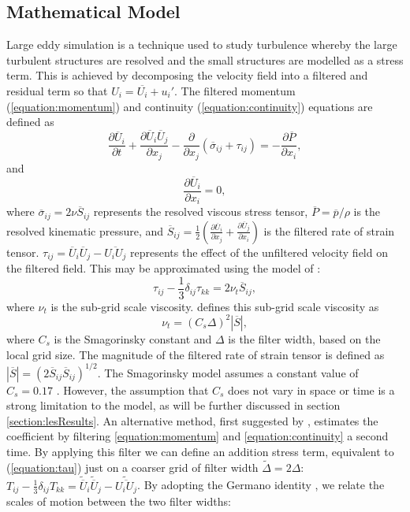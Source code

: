\documentclass[12pt,oneside,a4paper]{article}
\newcommand{\pdev}[2]{\frac{\partial {#1}}{\partial {#2}}}
\newcommand{\vecti}[1]{{#1}_{i}}
\newcommand{\vectj}[1]{{#1}_{j}}
\newcommand{\matij}[1]{{#1}_{ij}}
\begin{document}
\subsection{Mathematical Model}
\label{section:mathematicalModel}
Large eddy simulation is a technique used to study turbulence whereby the large turbulent structures are resolved and the small structures are modelled as a stress term. This is achieved by decomposing the velocity field into a filtered and residual term so that $\vecti{U} = \overline{\vecti{U}} + \vecti{u}'$. The filtered momentum (\ref{equation:momentum}) and continuity (\ref{equation:continuity}) equations \citep{pope2001} are defined as
\begin{equation}
\label{equation:momentum}
\pdev{\vecti{\overline{U}}}{t} + \pdev{\vecti{\overline{U}} \vectj{\overline{U}}}{\vectj{x}} - \pdev{}{\vectj{x}}(\matij{\overline{\sigma}} + \matij{\tau}) = - \pdev{\overline{P}}{\vecti{x}},
\end{equation}
and
\begin{equation}
\label{equation:continuity}
\pdev{\vecti{\overline{U}}}{\vecti{x}} = 0,
\end{equation}
where $\matij{\overline{\sigma}} = 2\nu \matij{\overline{S}}$ represents the resolved viscous stress tensor, $\overline{P} = \overline{p}/\rho$ is the resolved kinematic pressure, and $\matij{\overline{S}} = \frac{1}{2}\left( \pdev{\vecti{\overline{U}}}{\vectj{x}} + \pdev{\vectj{\overline{U}}}{\vecti{x}} \right)$ is the filtered rate of strain tensor. $\tau_{ij} = \vecti{\overline{U}} \vectj{\overline{U}} - \overline{\vecti{U} \vectj{U}}$ represents the effect of the unfiltered velocity field on the filtered field. This may be approximated using the model of \cite{smagorinsky1963}:
\begin{equation}
\label{equation:tau}
\matij{\tau}-\frac{1}{3}\matij{\delta}\tau_{kk} = 2\nu_{t} \matij{\overline{S}},
\end{equation}
where $\nu_t$ is the sub-grid scale viscosity. \cite{smagorinsky1963} defines this sub-grid scale viscosity as
\begin{equation}
\label{equation:smagorinsky}
\nu_t = (C_s \Delta)^2 |\overline{S}|,
\end{equation}
where $C_s$ is the Smagorinsky constant and $\Delta$ is the filter width, based on the local grid size. The magnitude of the filtered rate of strain tensor is defined as $|\overline{S}|= (2 \matij{\overline{S}} \matij{\overline{S}})^{1/2}$. The Smagorinsky model assumes a constant value of $C_s = 0.17$ \citep{smagorinsky1963}. However, the assumption that $C_s$ does not vary in space or time is a strong limitation to the model, as will be further discussed in section \ref{section:lesResults}. An alternative method, first suggested by \cite{germano1991}, estimates the coefficient by filtering \eqref{equation:momentum} and \eqref{equation:continuity} a second time. By applying this filter we can define an addition stress term, equivalent to (\ref{equation:tau}) just on a coarser grid of filter width $\widetilde{\Delta} = 2\Delta$: $\matij{T}-\frac{1}{3}\matij{\delta}T_{kk} =\vecti{\widetilde{\overline{U}}}\vectj{\widetilde{\overline{U}}}-\widetilde{\overline{\vecti{U}\vectj{U}}}$. By adopting the Germano identity \citep{germano1991}, we relate the scales of motion between the two filter widths:
\end{document}
